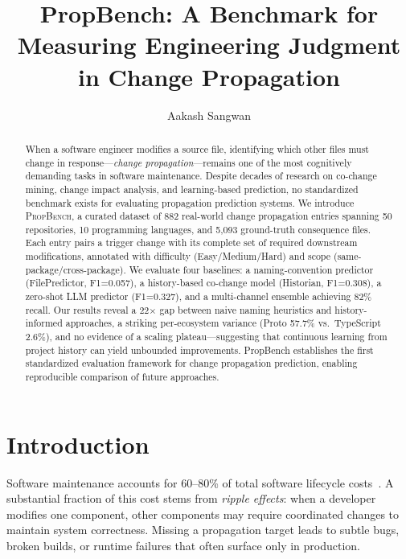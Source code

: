 \documentclass[sigconf,nonacm]{acmart}
\begin{document}
\title{PropBench: A Benchmark for Measuring Engineering Judgment in Change Propagation}

\author{Aakash Sangwan}

\begin{abstract}
When a software engineer modifies a source file, identifying which other files must change in response---\emph{change propagation}---remains one of the most cognitively demanding tasks in software maintenance. Despite decades of research on co-change mining, change impact analysis, and learning-based prediction, no standardized benchmark exists for evaluating propagation prediction systems. We introduce \textsc{PropBench}, a curated dataset of 882 real-world change propagation entries spanning 50 repositories, 10 programming languages, and 5{,}093 ground-truth consequence files. Each entry pairs a trigger change with its complete set of required downstream modifications, annotated with difficulty (Easy/Medium/Hard) and scope (same-package/cross-package). We evaluate four baselines: a naming-convention predictor (FilePredictor, F1=0.057), a history-based co-change model (Historian, F1=0.308), a zero-shot LLM predictor (F1=0.327), and a multi-channel ensemble achieving 82\% recall. Our results reveal a 22$\times$ gap between naive naming heuristics and history-informed approaches, a striking per-ecosystem variance (Proto 57.7\% vs.\ TypeScript 2.6\%), and no evidence of a scaling plateau---suggesting that continuous learning from project history can yield unbounded improvements. PropBench establishes the first standardized evaluation framework for change propagation prediction, enabling reproducible comparison of future approaches.
\end{abstract}


\maketitle

\section{Introduction}
\label{sec:intro}

Software maintenance accounts for 60--80\% of total software lifecycle costs~\cite{lientz1980}. A substantial fraction of this cost stems from \emph{ripple effects}: when a developer modifies one component, other components may require coordinated changes to maintain system correctness. Missing a propagation target leads to subtle bugs, broken builds, or runtime failures that often surface only in production.
\end{document}
